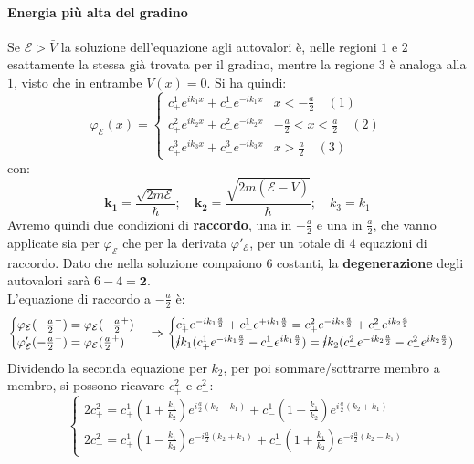 \documentclass[../../FisicaTeorica.tex]{subfiles}
\begin{document}
\paragraph{Energia più alta del gradino\\}
Se $\mathcal{E}>\bar{V}$ la soluzione dell'equazione agli autovalori è, nelle regioni $1$ e $2$ esattamente la stessa già trovata per il gradino, mentre la regione $3$ è analoga alla $1$, visto che in entrambe $V(x)=0$. Si ha quindi:
\begin{equation}
\varphi_\mathcal{E}(x)= \begin{cases}
c^1_+ e^{ik_1x} + c^1_-e^{-ik_1x} & x<-\frac{a}{2}\quad (1)\\
c^2_+ e^{ik_2x}+c^2_- e^{-ik_2x} & -\frac{a}{2}<x<\frac{a}{2}\quad (2)\\
c^3_+ e^{ik_3 x} + c^3_- e^{-ik_3 x} & x>\frac{a}{2}\quad(3)
\end{cases}
\label{eqn:autofunzioni_rettangolari}
\end{equation}
con:
\[
\bm{k_1}=\frac{\sqrt{2m\mathcal{E}}}{\hbar}; \quad \bm{k_2}=\frac{\sqrt{2m(\mathcal{E}-\bar{V})}}{\hbar}; \quad k_3 = k_1
\]
Avremo quindi due condizioni di \textbf{raccordo}, una in $-\frac{a}{2}$ e una in $\frac{a}{2}$, che vanno applicate sia per $\varphi_\mathcal{E}$ che per la derivata $\varphi'_\mathcal{E}$, per un totale di $4$ equazioni di raccordo. Dato che nella soluzione compaiono $6$ costanti, la \textbf{degenerazione} degli autovalori sarà $6-4=\bm{2}$.\\
L'equazione di raccordo a $-\frac{a}{2}$ è:
\[
\begin{cases}
\varphi_\mathcal{E}(-\frac{a}{2}^-)=\varphi_\mathcal{E}(-\frac{a}{2}^+)\\
\varphi'_\mathcal{E}(-\frac{a}{2}^-)=\varphi_\mathcal{E}(\frac{a}{2}^+)
\end{cases} \Rightarrow 
\begin{cases}
c^1_+ e^{-ik_1\frac{a}{2}}+c^1_- e^{+ik_1\frac{a}{2}}=c^2_+ e^{-ik_2\frac{a}{2}}+c^2_- e^{ik_2 \frac{a}{2}}\\
\cancel{i}k_1(c^1_+ e^{-ik_1\frac{a}{2}}-c^1_-e^{ik_1\frac{a}{2}})
=\cancel{i}k_2(c^2_+e^{-ik_2\frac{a}{2}}-c^2_-e^{ik_2\frac{a}{2}})
\end{cases}
\]
Dividendo la seconda equazione per $k_2$, per poi sommare/sottrarre membro a membro, si possono ricavare $c^2_+$ e $c^2_-$:
\begin{equation}
\begin{cases}
2c^2_+ = c^1_+\left(1+\frac{k_1}{k_2}\right) e^{i\frac{a}{2}(k_2-k_1)}+c^1_- \left(1-\frac{k_1}{k_2}\right) e^{i\frac{a}{2}(k_2+k_1)}\\
2c^2_- = c^1_+\left(1-\frac{k_1}{k_2}\right)e^{-i\frac{a}{2}(k_2+k_1)} + c^1_- \left(1+\frac{k_1}{k_2}\right) e^{-i\frac{a}{2}(k_2-k_1)}
\end{cases}
\label{eqn:raccordo1}
\end{equation}
\end{document}
